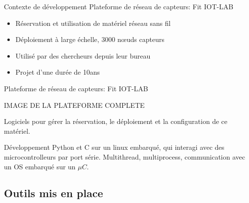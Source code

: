 \documentclass[9pt]{beamer}
\begin{document}
\begin{frame}{Contexte de développement}
        Plateforme de réseau de capteurs: Fit IOT-LAB
        \begin{itemize}
                \item <2->{Réservation et utilisation de matériel réseau sans fil}
                \item <2->{Déploiement à large échelle, 3000 nœuds capteurs}
                \item <2->{Utilisé par des chercheurs depuis leur bureau}
                \item <2->{Projet d'une durée de 10ans}
        \end{itemize}
\end{frame}
\begin{frame}{Plateforme de réseau de capteurs: Fit IOT-LAB}

        IMAGE DE LA PLATEFORME COMPLETE

        Logiciels pour gérer la réservation, le déploiement et la configuration de ce matériel.



        Développement Python et C sur un linux embarqué, qui interagi avec des microcontrolleurs par port série.
        Multithread, multiprocess, communication avec un OS embarqué sur un $\mu C$.




\end{frame}

\subsection{Outils mis en place}
\frame{\tableofcontents[currentsubsection,sectionstyle=show/shaded]}
\end{document}
